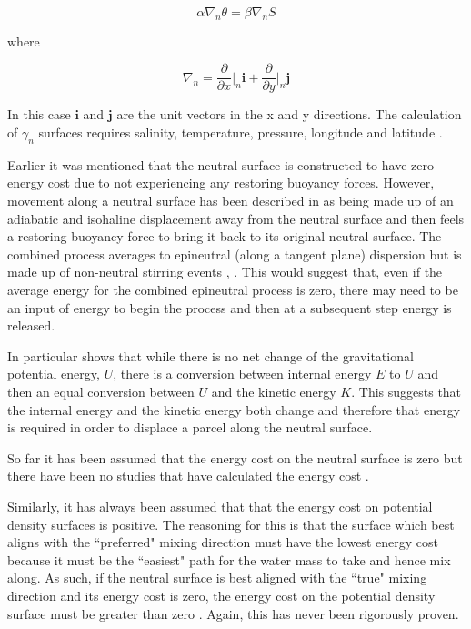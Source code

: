 \begin{equation}
    \alpha\nabla_n\theta = \beta\nabla_nS
    \label{equation:lit_review_density_surfaces_gamma_calc}
\end{equation}

where

\begin{equation}
    \nabla_n = \frac{\partial}{\partial x}\Bigg\lvert_n \mathbf{i} + \frac{\partial}{\partial y}\Bigg\lvert_n \mathbf{j}
\end{equation}

In this case $\mathbf{i}$ and $\mathbf{j}$ are the unit vectors in the x and y directions. The calculation of $\gamma_n$ surfaces requires salinity, temperature, pressure, longitude and latitude \citep{JackettandMcDougall1997}. 

Earlier it was mentioned that the neutral surface is constructed to have zero energy cost due to not experiencing any restoring buoyancy forces. However, movement along a neutral surface has been described in \citet{McDougall1987} as being made up of an adiabatic and isohaline  displacement away from the neutral surface and then feels a restoring buoyancy force to bring it back to its original neutral surface. The combined process averages to epineutral (along a tangent plane) dispersion but is made up of non-neutral stirring events \citep{Tailleux2016}, \citep{Nycander2011}. This would suggest that, even if the average energy for the combined epineutral process is zero, there may need to be an input of energy to begin the process and then at a subsequent step energy is released.

In particular \citet{Nycander2011} shows that while there is no net change of the gravitational potential energy, $U$, there is a conversion between internal energy $E$ 
to $U$ and then an equal conversion between $U$ and the kinetic energy $K$. This suggests that the internal energy and the kinetic energy both change and therefore that energy is required in order to displace a parcel along the neutral surface. 

So far it has been assumed that the energy cost on the neutral surface is zero but there have been no studies that have calculated the energy cost \citet{Tailleux2016}. 

Similarly, it has always been assumed that that the energy cost on potential density surfaces is positive. The reasoning for this is that the surface which best aligns with the ``preferred" mixing direction must have the lowest energy cost because it must be the ``easiest" path for the water mass to take and hence mix along. As such, if the neutral surface is best aligned with the ``true" mixing direction and its energy cost is zero, the energy cost on the potential density surface must be greater than zero \citep{McDougall1987}. Again, this has never been rigorously proven.  

